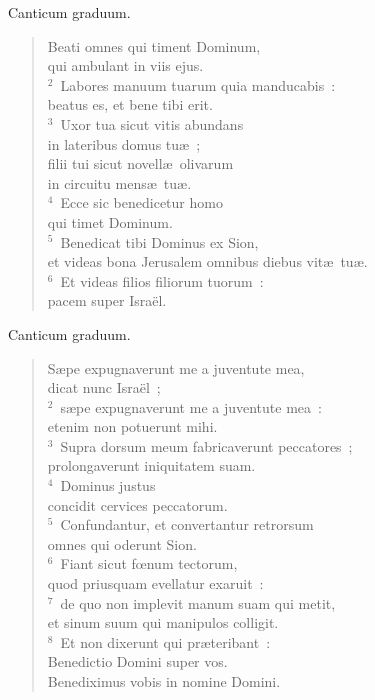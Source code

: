 \bchapter
\lettrine[lines=3,image=true,loversize=0.05,lraise=-0.03]{C}{}anticum graduum. \begin{flushleft}\begin{verse}\vspace{6pt}Beati omnes qui timent Dominum,\\ qui ambulant in viis ejus.\\
${}^{2}$~Labores manuum tuarum quia manducabis~:\\ beatus es, et bene tibi erit.\\
${}^{3}$~Uxor tua sicut vitis abundans\\ in lateribus domus tu\ae~;\\ filii tui sicut novell\ae\ olivarum\\ in circuitu mens\ae\ tu\ae .\\
${}^{4}$~Ecce sic benedicetur homo\\ qui timet Dominum.\\
${}^{5}$~Benedicat tibi Dominus ex Sion,\\ et videas bona Jerusalem omnibus diebus vit\ae\ tu\ae .\\
${}^{6}$~Et videas filios filiorum tuorum~:\\ pacem super Isra\"el.\end{verse}\end{flushleft}



\bchapter
\lettrine[lines=3,image=true,loversize=0.05,lraise=-0.03]{C}{}anticum graduum. \begin{flushleft}\begin{verse}\vspace{6pt}S\ae pe expugnaverunt me a juventute mea,\\ dicat nunc Isra\"el~;\\
${}^{2}$~s\ae pe expugnaverunt me a juventute mea~:\\ etenim non potuerunt mihi.\\
${}^{3}$~Supra dorsum meum fabricaverunt peccatores~;\\ prolongaverunt iniquitatem suam.\\
${}^{4}$~Dominus justus\\ concidit cervices peccatorum.\\
${}^{5}$~Confundantur, et convertantur retrorsum\\ omnes qui oderunt Sion.\\
${}^{6}$~Fiant sicut fœnum tectorum,\\ quod priusquam evellatur exaruit~:\\
${}^{7}$~de quo non implevit manum suam qui metit,\\ et sinum suum qui manipulos colligit.\\
${}^{8}$~Et non dixerunt qui pr\ae teribant~:\\ Benedictio Domini super vos.\\ Benediximus vobis in nomine Domini.\end{verse}\end{flushleft}



